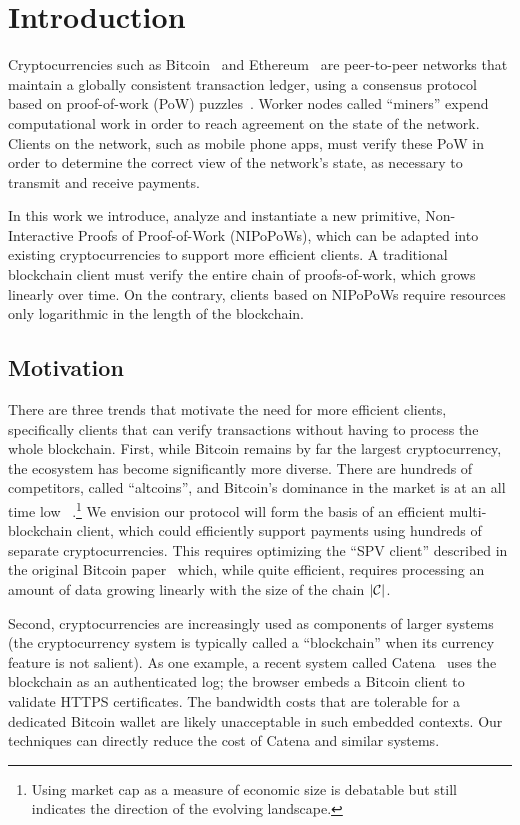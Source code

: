 \section{Introduction}

Cryptocurrencies such as Bitcoin~\cite{bitcoin}\cite{bitcoinsoftware} and
Ethereum~\cite{ethereum} are peer-to-peer networks that maintain a globally
consistent transaction ledger, using a consensus protocol based on proof-of-work
(PoW) puzzles~\cite{pow,hashcash}. Worker nodes called ``miners'' expend
computational work in order to reach agreement on the state of the network.
Clients on the network, such as mobile phone apps, must verify these
PoW in order to determine the correct view of the network's state, as necessary
to transmit and receive payments.

In this work we introduce, analyze and instantiate a new primitive,
Non-Interactive Proofs of Proof-of-Work (NIPoPoWs), which can be adapted into
existing cryptocurrencies to support more efficient clients. A traditional
blockchain client must verify the entire chain of proofs-of-work, which grows
linearly over time. On the contrary, clients based on NIPoPoWs require resources
only logarithmic in the length of the blockchain.

\subsection{Motivation}
There are three trends that motivate the need for more efficient clients,
specifically clients that can verify transactions without having to process the
whole blockchain. First, while Bitcoin remains by far the largest
cryptocurrency, the ecosystem has become significantly more diverse. There are
hundreds of competitors, called ``altcoins'', and Bitcoin's dominance in the
market is at an all time low ~\cite{marketcap}.\footnote{Using market cap as a
measure of economic size is debatable but still indicates the direction of the
evolving landscape.} We envision our protocol will form the basis of an
efficient multi-blockchain client, which could efficiently support payments
using hundreds of separate cryptocurrencies. This requires optimizing the ``SPV
client'' described in the original Bitcoin paper~\cite{bitcoin} which, while
quite efficient, requires processing an amount of data growing linearly with the
size of the chain $|\mathcal{C}|$.

Second, cryptocurrencies are increasingly used as components of larger systems
(the cryptocurrency system is typically called a ``blockchain'' when its
currency feature is not salient). As one example, a recent system called
Catena~\cite{catena} uses the blockchain as an authenticated log; the browser
embeds a Bitcoin client to validate HTTPS certificates. The bandwidth costs that
are tolerable for a dedicated Bitcoin wallet are likely unacceptable in such
embedded contexts. Our techniques can directly reduce the cost of Catena and
similar systems.


